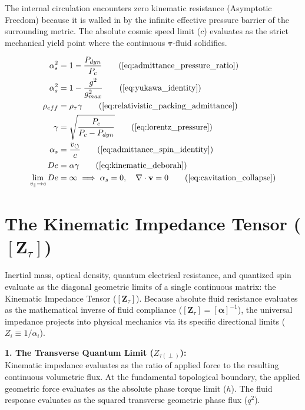 \documentclass[11pt, a4paper]{article}
\begin{document}
The internal circulation encounters zero kinematic resistance (Asymptotic Freedom) because it is walled in by the infinite effective pressure barrier of the surrounding metric. The absolute cosmic speed limit ($c$) evaluates as the strict mechanical yield point where the continuous $\boldsymbol{\tau}$-fluid solidifies.

\begin{tcolorbox}[recallbox, title={\ref{box:viscoelastic_stiffening}. Viscoelastic Phase Stiffening \& Time Dilation}]
\begin{align}
    \alpha_s^2 &= 1 - \frac{P_{dyn}}{P_c} \tag{\ref{eq:admittance_pressure_ratio}} \\
    \alpha_s^2 &= 1 - \frac{g^2}{g_{max}^2} \tag{\ref{eq:yukawa_identity}} \\
    \rho_{eff} &= \rho_{\tau} \gamma \tag{\ref{eq:relativistic_packing_admittance}} \\
    \gamma &= \sqrt{\frac{P_c}{P_c - P_{dyn}}} \tag{\ref{eq:lorentz_pressure}} \\
    \alpha_s &= \frac{v_{\circlearrowleft}}{c} \tag{\ref{eq:admittance_spin_identity}} \\
    De &= \alpha \gamma \tag{\ref{eq:kinematic_deborah}} \\
    \lim_{v_{\parallel} \to c} De &= \infty \implies \alpha_s = 0, \quad \nabla \cdot \mathbf{v} = 0 \tag{\ref{eq:cavitation_collapse}} 
\end{align}
\end{tcolorbox}


\section{The Kinematic Impedance Tensor ($[\boldsymbol{Z}_{\tau}]$)}
\label{sec:deriv_universal_impedance}

Inertial mass, optical density, quantum electrical resistance, and quantized spin evaluate as the diagonal geometric limits of a single continuous matrix: the Kinematic Impedance Tensor ($[\boldsymbol{Z}_{\tau}]$). Because absolute fluid resistance evaluates   as the mathematical inverse of fluid compliance ($[\boldsymbol{Z}_{\tau}] = [\boldsymbol{\alpha}]^{-1}$), the universal impedance projects into physical mechanics via its specific directional limits ($Z_i \equiv 1/\alpha_i$).

\textbf{1. The Transverse Quantum Limit ($Z_{\tau(\perp)}$):} \\
Kinematic impedance evaluates as the ratio of applied force to the resulting continuous volumetric flux. At the fundamental topological boundary, the applied geometric force evaluates as the absolute phase torque limit ($h$). The fluid response evaluates as the squared transverse geometric phase flux ($q^2$).
\end{document}
